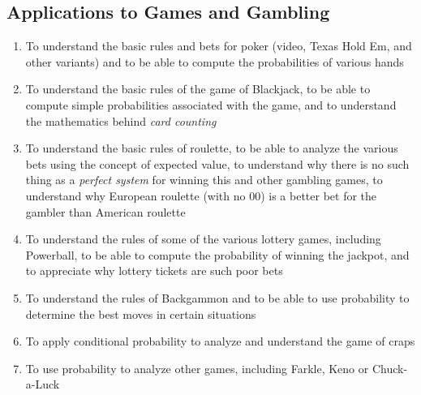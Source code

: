 \documentclass[11pt]{article}
\begin{document}
\subsection{Applications to Games and Gambling}
\begin{enumerate}
\item To understand the basic rules and bets for poker
(video, Texas Hold Em, and other variants)
and to be able to compute the probabilities of various hands
\item To understand the basic rules of the game of Blackjack,
to be able to compute simple probabilities associated with the game,
and to understand the mathematics behind {\em card counting}
\item To understand the basic rules of roulette,
to be able to analyze the various bets using the concept of expected value,
to understand why there is no such thing as a {\em perfect system}
for winning this and other gambling games,
to understand why European roulette (with no $00$)
is a better bet for the gambler than American roulette 
\item To understand the rules of some of the various lottery games,
including Powerball,
to be able to compute the probability of winning the jackpot,
and to appreciate why lottery tickets are such poor bets
\item To understand the rules of Backgammon and to be able to use
probability to determine the best moves in certain situations
\item To apply conditional probability to analyze
and understand the game of craps
\item To use probability to analyze other games,
including Farkle, Keno or Chuck-a-Luck
\end{enumerate}
\end{document}
